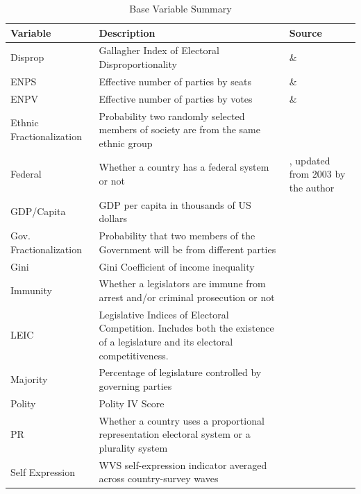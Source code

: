 \documentclass[a4paper]{article}\usepackage{graphicx, color}
\begin{document}
\begin{table}[!h]
    \begin{center}
    \caption{Base Variable Summary}
    \label{var_summary}
    \begin{tabular}{l m{7cm} m{3.5cm}}

            \hline
            Variable & Description & Source \\
            \hline \hline
            Disprop & Gallagher Index of Electoral Disproportionality & \cite{Gallagher2012} \& \cite{Carey2011} \\
            ENPS & Effective number of parties by seats & \cite{Gallagher2012} \& \cite{Carey2011} \\
            ENPV & Effective number of parties by votes & \cite{Gallagher2012} \& \cite{Carey2011} \\
            Ethnic Fractionalization & Probability two randomly selected members of society are from the same ethnic group & \cite{Alesina2003} \\
            Federal & Whether a country has a federal system or not & \cite{Carey2011}, updated from 2003 by the author \\           
            GDP/Capita & GDP per capita in thousands of US dollars & \cite{WorldBank2011} \\
            Gov. Fractionalization & Probability that two members of the Government will be from different parties & \cite{DPI2001} \\
            Gini & Gini Coefficient of income inequality & \cite{UNU2008} \\
            Immunity & Whether a legislators are immune from arrest and/or criminal prosecution or not & \cite{Fish2009} \\
            LEIC & Legislative Indices of Electoral Competition. Includes both the existence of a legislature and its electoral competitiveness. & \cite{DPI2001} \\
            Majority & Percentage of legislature controlled by governing parties & \cite{DPI2001} \\
            Polity & Polity IV Score & \cite{Marshall2009} \\
            PR & Whether a country uses a proportional representation electoral system or a plurality system & \cite{DPI2001} \\
            Self Expression & WVS self-expression indicator averaged across country-survey waves & \cite{WVS2009} \\

\end{tabular}
\end{center}
\end{table}
\end{document}
